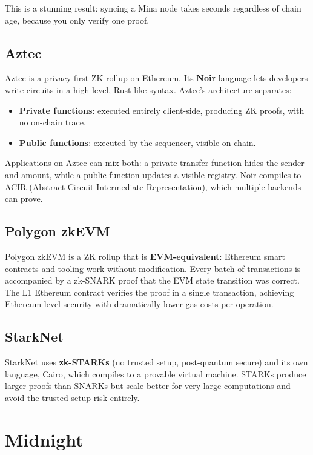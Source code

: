 This is a stunning result: syncing a Mina node takes seconds regardless of chain age, because you only verify one proof.

\subsection*{Aztec}

Aztec is a privacy-first ZK rollup on Ethereum. Its \textbf{Noir} language lets developers write circuits in a high-level, Rust-like syntax. Aztec's architecture separates:

\begin{itemize}
  \item \textbf{Private functions}: executed entirely client-side, producing ZK proofs, with no on-chain trace.
  \item \textbf{Public functions}: executed by the sequencer, visible on-chain.
\end{itemize}

Applications on Aztec can mix both: a private transfer function hides the sender and amount, while a public function updates a visible registry. Noir compiles to ACIR (Abstract Circuit Intermediate Representation), which multiple backends can prove.

\subsection*{Polygon zkEVM}

Polygon zkEVM is a ZK rollup that is \textbf{EVM-equivalent}: Ethereum smart contracts and tooling work without modification. Every batch of transactions is accompanied by a zk-SNARK proof that the EVM state transition was correct. The L1 Ethereum contract verifies the proof in a single transaction, achieving Ethereum-level security with dramatically lower gas costs per operation.

\subsection*{StarkNet}

StarkNet uses \textbf{zk-STARKs} (no trusted setup, post-quantum secure) and its own language, Cairo, which compiles to a provable virtual machine. STARKs produce larger proofs than SNARKs but scale better for very large computations and avoid the trusted-setup risk entirely.

\section{Midnight} \label{sec:midnight}

